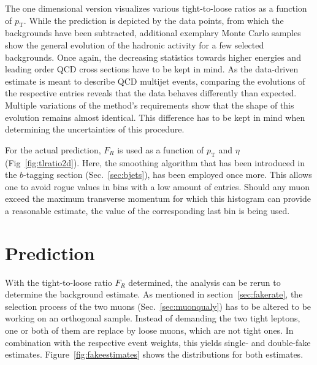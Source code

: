 The one dimensional version visualizes various tight-to-loose ratios as a function of $p_{\text{T}}$. While the prediction is depicted by the data points, from which the backgrounds have been subtracted, additional exemplary Monte Carlo samples show the general evolution of the hadronic activity for a few selected backgrounds. Once again, the decreasing statistics towards higher energies and leading order QCD cross sections have to be kept in mind. As the data-driven estimate is meant to describe QCD multijet events, comparing the evolutions of the respective entries reveals that the data behaves differently than expected. Multiple variations of the method's requirements show that the shape of this evolution remains almost identical. This difference has to be kept in mind when determining the uncertainties of this procedure.  

For the actual prediction, $F_R$ is used as a function of $p_{\text{T}}$ and $\eta$ (Fig~\ref{fig:tlratio2d}). Here, the smoothing algorithm that has been introduced in the $b$-tagging section (Sec.~\ref{sec:bjets}), has been employed once more. This allows one to avoid rogue values in bins with a low amount of entries. Should any muon exceed the maximum transverse momentum for which this histogram can provide a reasonable estimate, the value of the corresponding last bin is being used.

\section{Prediction}
\label{sec:tlprediction}

With the tight-to-loose ratio $F_R$ determined, the analysis can be rerun to determine the background estimate. As mentioned in section~\ref{sec:fakerate}, the selection process of the two muons (Sec.~\ref{sec:muonqualy}) has to be altered to be working on an orthogonal sample. Instead of demanding the two tight leptons, one or both of them are replace by loose muons, which are not tight ones. In combination with the respective event weights, this yields single- and double-fake estimates. Figure~\ref{fig:fakeestimates} shows the distributions for both estimates.

